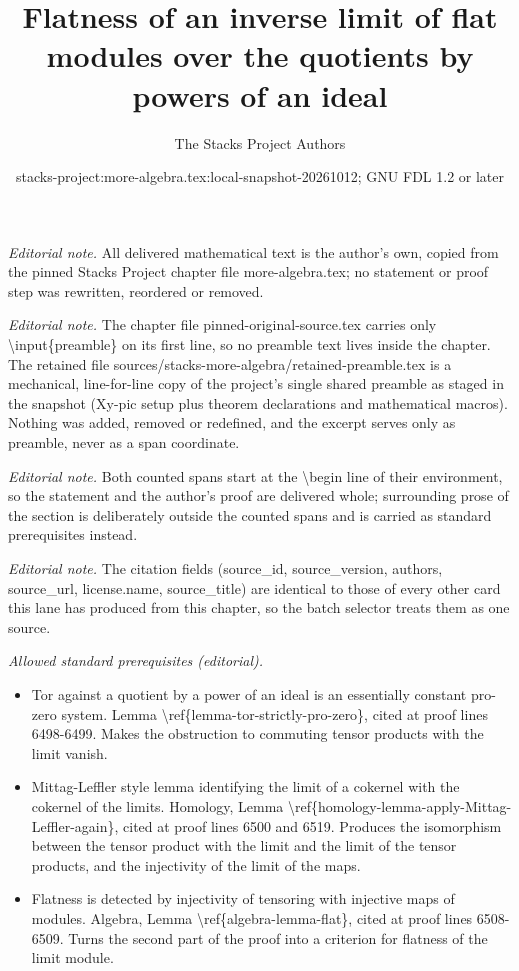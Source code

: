 \documentclass[10pt,a4paper]{amsart}
\title{Flatness of an inverse limit of flat modules over the quotients by powers of an ideal}
\author{The Stacks Project Authors}
\date{stacks-project:more-algebra.tex:local-snapshot-20261012; GNU FDL 1.2 or later}
\theoremstyle{plain}
\theoremstyle{definition}
\theoremstyle{remark}
\numberwithin{equation}{subsection}
\begin{document}
\maketitle
\setcounter{subsection}{1}
\noindent\textit{Editorial note.} All delivered mathematical text is the author's own, copied from the pinned Stacks Project chapter file more-algebra.tex; no statement or proof step was rewritten, reordered or removed.\par\medskip
\noindent\textit{Editorial note.} The chapter file pinned-original-source.tex carries only \textbackslash{}input\{preamble\} on its first line, so no preamble text lives inside the chapter. The retained file sources/stacks-more-algebra/retained-preamble.tex is a mechanical, line-for-line copy of the project's single shared preamble as staged in the snapshot (Xy-pic setup plus theorem declarations and mathematical macros). Nothing was added, removed or redefined, and the excerpt serves only as preamble, never as a span coordinate.\par\medskip
\noindent\textit{Editorial note.} Both counted spans start at the \textbackslash{}begin line of their environment, so the statement and the author's proof are delivered whole; surrounding prose of the section is deliberately outside the counted spans and is carried as standard prerequisites instead.\par\medskip
\noindent\textit{Editorial note.} The citation fields (source\_id, source\_version, authors, source\_url, license.name, source\_title) are identical to those of every other card this lane has produced from this chapter, so the batch selector treats them as one source.\par\medskip
\noindent\textit{Allowed standard prerequisites (editorial).}\begin{itemize}
\item Tor against a quotient by a power of an ideal is an essentially constant pro-zero system. Lemma \textbackslash{}ref\{lemma-tor-strictly-pro-zero\}, cited at proof lines 6498-6499. Makes the obstruction to commuting tensor products with the limit vanish.
\item Mittag-Leffler style lemma identifying the limit of a cokernel with the cokernel of the limits. Homology, Lemma \textbackslash{}ref\{homology-lemma-apply-Mittag-Leffler-again\}, cited at proof lines 6500 and 6519. Produces the isomorphism between the tensor product with the limit and the limit of the tensor products, and the injectivity of the limit of the maps.
\item Flatness is detected by injectivity of tensoring with injective maps of modules. Algebra, Lemma \textbackslash{}ref\{algebra-lemma-flat\}, cited at proof lines 6508-6509. Turns the second part of the proof into a criterion for flatness of the limit module.
\end{itemize}\medskip
\end{document}
